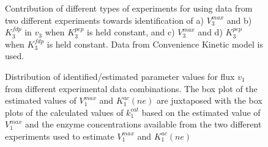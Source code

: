 \documentclass[10pt]{article}
\begin{document}
\begin{figure}[!tbhp]
	\caption{Contribution of different types of experiments for using data from two different experiments towards identification of a) $V_3^{max}$ and b) $K_3^{fdp}$ in $v_3$ when $K_3^{pep}$ is held constant, and c) $V_3^{max}$ and d) $K_3^{pep}$ when $K_3^{fdp}$ is held constant. Data from Convenience Kinetic model is used.}%
\end{figure}	

\begin{figure}[!tbhp]
	\caption{Distribution of identified/estimated parameter values for flux $v_1$ from different experimental data combinations. The box plot of the estimated values of $V_1^{max}$ and $K_1^{ac}(ne)$ are juxtaposed with the box plots of the calculated values of $k_1^{cat}$ based on the estimated value of $V_1^{max}$ and the enzyme concentrations available from the two different experiments used to estimate $V_1^{max}$ and $K_1^{ac}(ne)$}\label{fig:parameter_value_v1_v1max_kcat}
\end{figure}	
\end{document}

